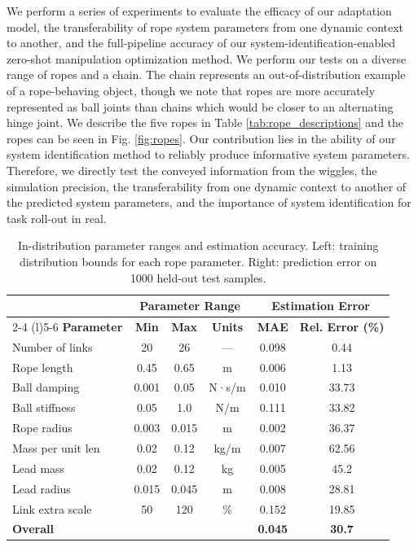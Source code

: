 \documentclass[conference]{IEEEtran}
\begin{document}
We perform a series of experiments to evaluate the efficacy of our adaptation model, the transferability of rope system parameters from one dynamic context to another, and the full-pipeline accuracy of our system-identification-enabled zero-shot manipulation optimization method. We perform our tests on a diverse range of ropes and a chain. The chain represents an out-of-distribution example of a rope-behaving object, though we note that ropes are more accurately represented as ball joints than chains which would be closer to an alternating hinge joint. We describe the five ropes in Table \ref{tab:rope_descriptions} and the ropes can be seen in Fig. \ref{fig:ropes}. Our contribution lies in the ability of our system identification method to reliably produce informative system parameters. Therefore, we directly test the conveyed information from the wiggles, the simulation precision, the transferability from one dynamic context to another of the predicted system parameters, and the importance of system identification for task roll-out in real. 



\begin{table}[t]
\centering
\caption{In-distribution parameter ranges and estimation accuracy. Left: training distribution bounds for each rope parameter. Right: prediction error on 1000 held-out test samples.}
\label{tab:in_domain_results}
\begin{tabular}{lccc|cc}
\toprule
& \multicolumn{3}{c}{\textbf{Parameter Range}} & \multicolumn{2}{c}{\textbf{Estimation Error}} \\
\cmidrule(lr){2-4} \cmidrule(l){5-6}
\textbf{Parameter} & \textbf{Min} & \textbf{Max} & \textbf{Units} & \textbf{MAE} & \textbf{Rel. Error (\%)} \\
\midrule
Number of links & 20 & 26 & --- & 0.098 & 0.44 \\
Rope length & 0.45 & 0.65 & m & 0.006 & 1.13 \\
Ball damping & 0.001 & 0.05 & N·s/m & 0.010 & 33.73 \\
Ball stiffness & 0.05 & 1.0 & N/m & 0.111 & 33.82 \\
Rope radius & 0.003 & 0.015 & m & 0.002 & 36.37 \\
Mass per unit len & 0.02 & 0.12 & kg/m & 0.007 & 62.56 \\
Lead mass & 0.02 & 0.12 & kg & 0.005 & 45.2 \\
Lead radius & 0.015 & 0.045 & m & 0.008 & 28.81 \\
Link extra scale & 50 & 120 & \% & 0.152 & 19.85 \\
\midrule
\multicolumn{4}{l|}{\textbf{Overall}} & \textbf{0.045} & \textbf{30.7} \\
\bottomrule
\end{tabular}
\end{table}
\end{document}
